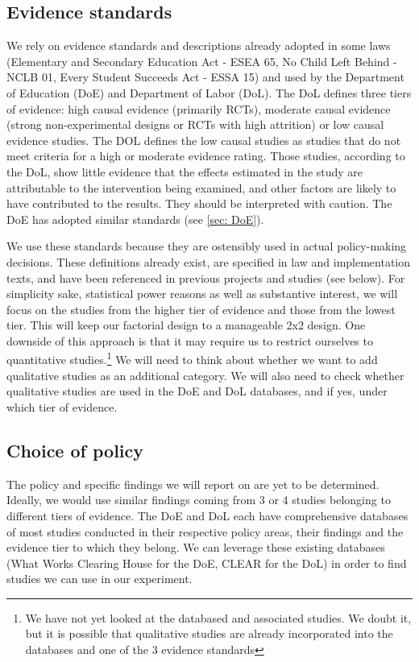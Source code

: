 \documentclass[12pt,final,fleqn]{article}
\theoremstyle{plain}
\begin{document}
\subsection{Evidence standards} \label{sec:Evidence}

We rely on evidence standards and descriptions already adopted in some laws (Elementary and Secondary Education Act - ESEA 65, No Child Left Behind - NCLB 01, Every Student Succeeds Act - ESSA 15) and used by the Department of Education (DoE) and Department of Labor (DoL). The DoL defines three tiers of evidence: high causal evidence (primarily RCTs), moderate causal evidence (strong non-experimental designs or RCTs with high attrition) or low causal evidence studies. The DOL defines the low causal studies as studies that do not meet criteria for a high or moderate evidence rating. Those studies, according to the DoL, show little evidence that the effects estimated in the study are attributable to the intervention being examined, and other factors are likely to have contributed to the results. They should be interpreted with caution. The DoE has adopted similar standards (see \autoref{sec: DoE}). 

We use these standards because they are ostensibly used in actual policy-making decisions. These definitions already exist, are specified in law and implementation texts, and have been referenced in previous projects and studies (see below). For simplicity sake, statistical power reasons as well as substantive interest, we will focus on the studies from the higher tier of evidence and those from the lowest tier. This will keep our factorial design to a manageable 2x2 design. One downside of this approach is that it may require us to restrict ourselves to quantitative studies.\footnote{We have not yet looked at the databased and associated studies. We doubt it, but it is possible that qualitative studies are already incorporated into the databases and one of the 3 evidence standards} We will need to think about whether we want to add qualitative studies as an additional category. We will also need to check whether qualitative studies are used in the DoE and DoL databases, and if yes, under which tier of evidence. 

\subsection{Choice of policy} \label{sec: Policy}

The policy and specific findings we will report on are yet to be determined. Ideally, we would use similar findings coming from 3 or 4 studies belonging to different tiers of evidence. The DoE and DoL each have comprehensive databases of most studies conducted in their respective policy areas, their findings and the evidence tier to which they belong. We can leverage these existing databases (What Works Clearing House for the DoE, CLEAR for the DoL) in order to find studies we can use in our experiment. 
\end{document}
